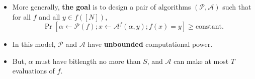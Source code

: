 \documentclass[usenames, dvipsnames, t, table]{beamer}
\newcommand{\A}{\mathcal{A}}
\renewcommand{\P}{\mathcal{P}}
\begin{document}
\begin{frame}[fragile]
\begin{itemize}
  \pause
\item More generally, \textbf{the goal} is to design a pair of algorithms $(\P, \A)$ such that for all $f$ and all $y \in f([N])$,
     \[\Pr[\alpha \gets \P(f); x \gets \A^f(\alpha, y); f(x) = y] \geq \text{constant}.\]
     \mypause
   \item In this model, $\P$ and $\A$ have \textbf{unbounded} computational power.
     \pause
   \item But, $\alpha$ must have bitlength no more than $S$, and $\A$ can make at most $T$ evaluations of $f$.
   \end{itemize}
 \end{frame}

\end{document}
